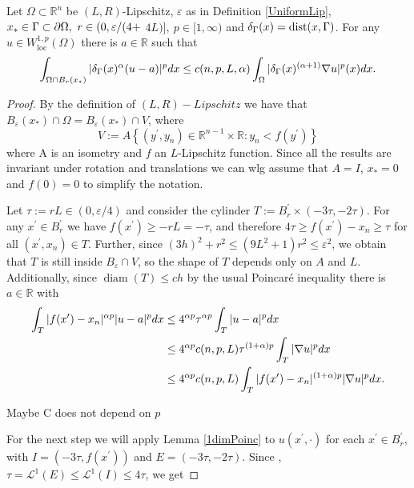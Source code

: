 \begin{lemma}\label{PoincareBoundary}
     Let $\Omega \subset \mathbb{R}^n$ be $(L, R)$-Lipschitz, $\varepsilon$ as in Definition \ref{UniformLip}, $x_* \in \Gamma\subset\partial\Omega,\ r \in(0, \varepsilon /(4+$ $4 L)],\ p \in[1, \infty)$ and $\delta_\Gamma(x)=\operatorname{dist}(x, \Gamma)$. For any $u \in W_{\mathrm{loc}}^{1, p}(\Omega)$ there is $a \in \mathbb{R}$ such that
$$
\int_{\Omega \cap B_r\left(x_*\right)}|\delta_\Gamma(x)^\alpha (u-a)|^p d x \leq c(n,p,L,\alpha) \int_{\Omega} |\delta_\Gamma(x)^{(\alpha+1)}\nabla u|^p(x) d x .
$$

\end{lemma}
\begin{proof}
    By the definition of $(L,R)-Lipschitz$ we have that $B_{\varepsilon}\left(x_*\right) \cap \Omega=B_{\varepsilon}\left(x_*\right) \cap V$, where 
$$
V:=A\left\{\left(y^{\prime}, y_n\right) \in \mathbb{R}^{n-1} \times \mathbb{R}: y_n<f\left(y^{\prime}\right)\right\}
$$ where A is an isometry and $f$ an $L$-Lipschitz  function. Since all the results are invariant under rotation and translations we can wlg assume that $A=I$, $x_*=0$ and $f(0)=0$ to simplify the notation.

Let $\tau:= r L \in(0, \varepsilon / 4)$ and consider the cylinder $T:=B_r^{\prime} \times(-3 \tau,-2 \tau)$. For any $x^{\prime} \in B_r^{\prime}$ we have $f\left(x^{\prime}\right) \geq-r L=-\tau$, and therefore $4\tau\geq f\left(x^{\prime}\right)-x_n \geq \tau$ for all $\left(x^{\prime}, x_n\right) \in T$. Further, since $(3 h)^2+r^2 \leq (9L^2+1)r^2\leq \varepsilon^2$, we obtain that $T$  is still inside  $B_{\varepsilon} \cap V$, so the shape of $T$ depends only on $A$ and $L$. Additionally, since  $\operatorname{diam}(T)\leq c h$  by the usual Poincaré inequality there is $a \in \mathbb{R}$ with
\begin{align*}
\int_T|f(x')-x_n|^{\alpha p}|u-a|^p d x &\leq 4^{\alpha p} \tau^{\alpha p}\int_T|u-a|^p dx\\
&\leq 4^{\alpha p} c(n,p,L) \tau^{(1+\alpha)p} \int_T|\nabla u|^p d x\\
&\leq 4^{\alpha p} c(n,p,L) \int_T|f(x')-x_n|^{(1+\alpha) p}|\nabla u|^p d x.
\end{align*}
\begin{question}
    Maybe C does not depend on $p$ 
\end{question}


 For the next step we will apply Lemma \ref{1dimPoinc} to $u\left(x^{\prime}, \cdot\right)$ for each $x^{\prime} \in B_r^{\prime}$, with $I=\left(-3 \tau, f\left(x^{\prime}\right)\right)$ and $E=(-3 \tau,-2 \tau)$. Since , $\tau=\mathcal{L}^1(E) \leq \mathcal{L}^1(I) \leq 4 \tau$, we get 
 

\end{proof}
